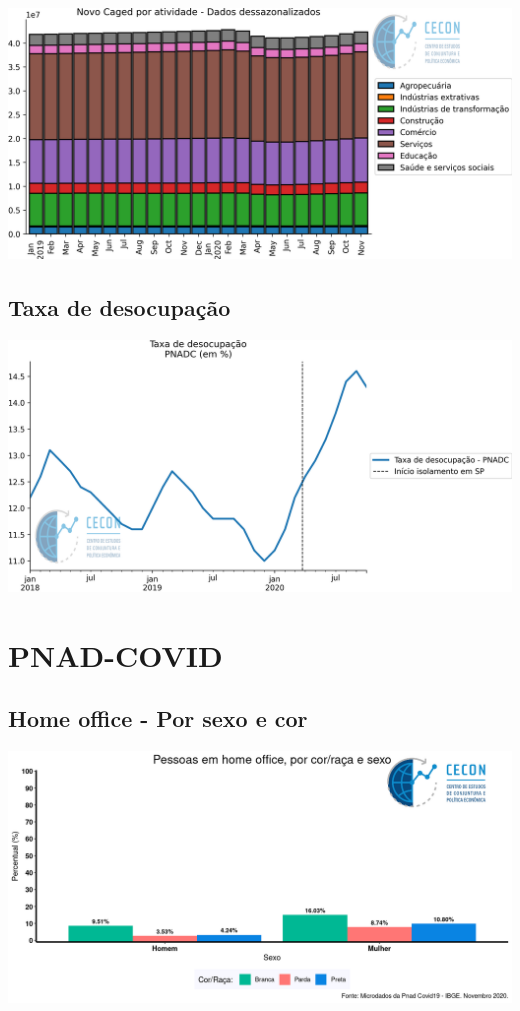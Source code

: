 \documentclass{SelfArx}
\begin{document}
\begin{center}
\includegraphics[width=.9\linewidth]{./figs/Emprego/NovoCaged_Atividade.png}
\end{center}



\subsection*{Taxa de desocupação}
\label{sec:orgdf7760d}

\begin{center}
\includegraphics[width=.9\linewidth]{./figs/Emprego/TaxaDesocupacao.png}
\end{center}

\section*{PNAD-COVID}
\label{sec:org62accc3}
\subsection*{Home office - Por sexo e cor}
\label{sec:org6122008}




\begin{center}
\includegraphics[width=.9\linewidth]{./figs/PNAD_COVID/home_sexo_cor.png}
\end{center}
\end{document}

